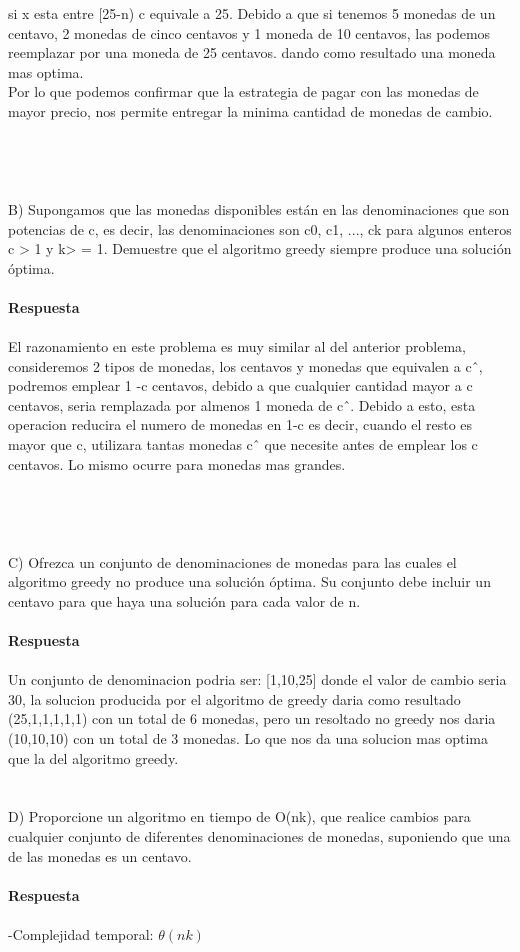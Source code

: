 \documentclass[a4paper,12pt]{article}
\begin{document}
si x esta entre [25-n) c equivale a 25. Debido a que si tenemos 5 monedas de un centavo, 2 monedas de cinco centavos y 1 moneda de 10 centavos, las podemos reemplazar por una moneda de 25 centavos. dando como resultado una moneda mas optima.\\
Por lo que podemos confirmar que la estrategia de pagar con las monedas de mayor precio, nos permite entregar la minima cantidad de monedas de cambio.\\
\cite{CLRS}\\\\\\\\
B) Supongamos que las monedas disponibles están en las denominaciones que son potencias de c, es decir, las denominaciones son c0, c1, ..., ck para algunos enteros c > 1 y k> = 1. Demuestre que el algoritmo greedy siempre produce una solución óptima.\\\\
\textbf{Respuesta}\\\\
El razonamiento en este problema es muy similar al del anterior problema, consideremos 2 tipos de monedas, los centavos y monedas que equivalen a cˆ, podremos emplear 1 -c centavos, debido a que cualquier cantidad mayor a c centavos, seria remplazada por almenos 1 moneda de cˆ. Debido a esto, esta operacion reducira el numero de monedas en 1-c es decir, cuando el resto es mayor que c, utilizara tantas monedas cˆ que necesite antes de emplear los  c centavos. Lo mismo ocurre para monedas mas grandes.\\
\cite{CLRS}\\\\\\\\
C) Ofrezca un conjunto de denominaciones de monedas para las cuales el algoritmo greedy no produce una solución óptima. Su conjunto debe incluir un centavo para que haya una solución para cada valor de n.\\\\
\textbf{Respuesta}\\\\
Un conjunto de denominacion podria ser:
[1,10,25] donde el valor de cambio seria 30, la solucion producida por el algoritmo de greedy daria como resultado (25,1,1,1,1,1) con un total de 6 monedas, pero un resoltado no greedy nos daria (10,10,10) con un total de 3 monedas. Lo que nos da una solucion mas optima que la del algoritmo greedy.\\\\\\
D) Proporcione un algoritmo en tiempo de O(nk), que realice cambios para cualquier conjunto de diferentes denominaciones de monedas, suponiendo que una de las monedas es un centavo.\\\\
\textbf{Respuesta}\\\\

-Complejidad temporal: $\theta(nk)$
\end{document}

